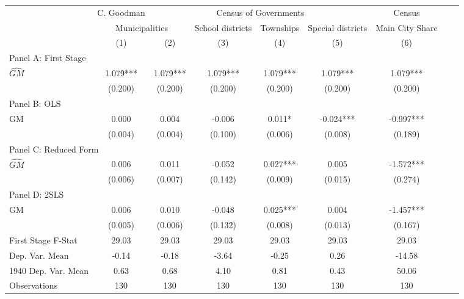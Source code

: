 \begin{tabular}{l*{8}{c}} \toprule
&\multicolumn{1}{c}{C. Goodman}&\multicolumn{4}{c}{Census of Governments}&\multicolumn{1}{c}{Census}\\\cmidrule(lr){2-2}\cmidrule(lr){3-6}\cmidrule(lr){7-7}
&\multicolumn{2}{c}{Municipalities}&\multicolumn{1}{c}{School districts}&\multicolumn{1}{c}{Townships}&\multicolumn{1}{c}{Special districts}&\multicolumn{1}{c}{Main City Share}\\\cmidrule(lr){2-3}\cmidrule(lr){4-6}\cmidrule(lr){7-7}
&\multicolumn{1}{c}{(1)}&\multicolumn{1}{c}{(2)}&\multicolumn{1}{c}{(3)}&\multicolumn{1}{c}{(4)}&\multicolumn{1}{c}{(5)}&\multicolumn{1}{c}{(6)}\\
\cmidrule(lr){1-7}
\multicolumn{6}{l}{Panel A: First Stage}\\
\cmidrule(lr){1-7}
$\widehat{GM}$  &    1.079***&    1.079***&    1.079***&    1.079***&    1.079***&    1.079***\\
                &  (0.200)   &  (0.200)   &  (0.200)   &  (0.200)   &  (0.200)   &  (0.200)   \\
\cmidrule(lr){1-7}
\multicolumn{6}{l}{Panel B: OLS}\\
\cmidrule(lr){1-7}
GM              &    0.000   &    0.004   &   -0.006   &    0.011*  &   -0.024***&   -0.997***\\
                &  (0.004)   &  (0.004)   &  (0.100)   &  (0.006)   &  (0.008)   &  (0.189)   \\
\cmidrule(lr){1-7}
\multicolumn{6}{l}{Panel C: Reduced Form}\\
\cmidrule(lr){1-7}
$\widehat{GM}$  &    0.006   &    0.011   &   -0.052   &    0.027***&    0.005   &   -1.572***\\
                &  (0.006)   &  (0.007)   &  (0.142)   &  (0.009)   &  (0.015)   &  (0.274)   \\
\cmidrule(lr){1-7}
\multicolumn{6}{l}{Panel D: 2SLS}\\
\cmidrule(lr){1-7}
GM              &    0.006   &    0.010   &   -0.048   &    0.025***&    0.004   &   -1.457***\\
                &  (0.005)   &  (0.006)   &  (0.132)   &  (0.008)   &  (0.013)   &  (0.167)   \\
\midrule
First Stage F-Stat&    29.03   &    29.03   &    29.03   &    29.03   &    29.03   &    29.03   \\
Dep. Var. Mean  &    -0.14   &    -0.18   &    -3.64   &    -0.25   &     0.26   &   -14.58   \\
1940 Dep. Var. Mean&     0.63   &     0.68   &     4.10   &     0.81   &     0.43   &    50.06   \\
Observations    &      130   &      130   &      130   &      130   &      130   &      130   \\
       \bottomrule \end{tabular}
